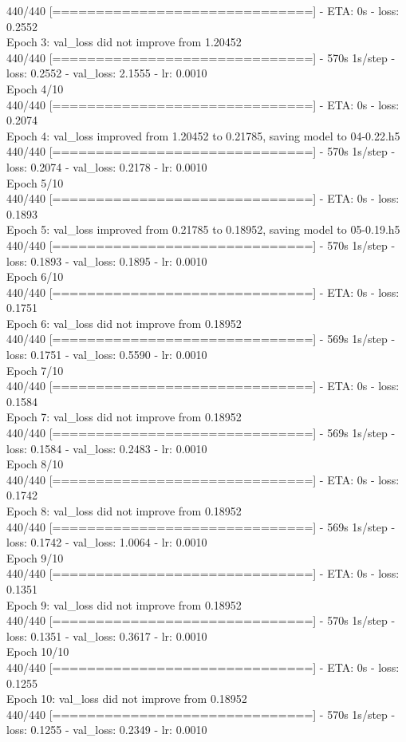 \documentclass{article}
\begin{document}
440/440 [==============================] - ETA: 0s - loss: 0.2552\\
Epoch 3: val\_loss did not improve from 1.20452\\
440/440 [==============================] - 570s 1s/step - loss: 0.2552 - val\_loss: 2.1555 - lr: 0.0010\\
Epoch 4/10\\
440/440 [==============================] - ETA: 0s - loss: 0.2074\\
Epoch 4: val\_loss improved from 1.20452 to 0.21785, saving model to 04-0.22.h5\\
440/440 [==============================] - 570s 1s/step - loss: 0.2074 - val\_loss: 0.2178 - lr: 0.0010\\
Epoch 5/10\\
440/440 [==============================] - ETA: 0s - loss: 0.1893\\
Epoch 5: val\_loss improved from 0.21785 to 0.18952, saving model to 05-0.19.h5\\
440/440 [==============================] - 570s 1s/step - loss: 0.1893 - val\_loss: 0.1895 - lr: 0.0010\\
Epoch 6/10\\
440/440 [==============================] - ETA: 0s - loss: 0.1751\\
Epoch 6: val\_loss did not improve from 0.18952\\
440/440 [==============================] - 569s 1s/step - loss: 0.1751 - val\_loss: 0.5590 - lr: 0.0010\\
Epoch 7/10\\
440/440 [==============================] - ETA: 0s - loss: 0.1584\\
Epoch 7: val\_loss did not improve from 0.18952\\
440/440 [==============================] - 569s 1s/step - loss: 0.1584 - val\_loss: 0.2483 - lr: 0.0010\\
Epoch 8/10\\
440/440 [==============================] - ETA: 0s - loss: 0.1742\\
Epoch 8: val\_loss did not improve from 0.18952\\
440/440 [==============================] - 569s 1s/step - loss: 0.1742 - val\_loss: 1.0064 - lr: 0.0010\\
Epoch 9/10\\
440/440 [==============================] - ETA: 0s - loss: 0.1351\\
Epoch 9: val\_loss did not improve from 0.18952\\
440/440 [==============================] - 570s 1s/step - loss: 0.1351 - val\_loss: 0.3617 - lr: 0.0010\\
Epoch 10/10\\
440/440 [==============================] - ETA: 0s - loss: 0.1255\\
Epoch 10: val\_loss did not improve from 0.18952\\
440/440 [==============================] - 570s 1s/step - loss: 0.1255 - val\_loss: 0.2349 - lr: 0.0010\\
\end{document}
